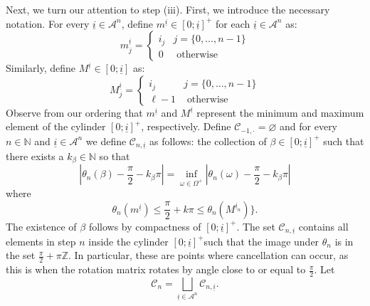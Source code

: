 \documentclass{amsart}
\newcommand{\NN}{\mathbb{N}}
\newcommand{\ZZ}{\mathbb{Z}}
\newcommand{\A}{\mathcal{A}}
\newcommand{\C}{\mathcal{C}}
\begin{document}
Next, we turn our attention to step (iii). First, we introduce the necessary notation. For every $\underline{i}\in \A^n$, define $m^{\underline{i}} \in [0;\underline{i}]^+$ for each $\underline{i}\in \A^n$ as:
\[m_j^{\underline{i}} = \begin{cases}
    i_j & j = \{0,\dots, n-1\}\\
    0 & \text{ otherwise }
\end{cases}\]
Similarly, define $M^{\underline{i}} \in [0;\underline{i}]$ as:
\[M_j^{\underline{i}} = \begin{cases}
    i_j & j = \{0,\dots, n-1\}\\
    \ell-1 & \text{ otherwise }
\end{cases}\]
Observe from our ordering that $m^{\underline{i}}$ and $M^{\underline{i}}$ represent the minimum and maximum element of the cylinder $[0;\underline{i}]^+$, respectively. Define $\C_{-1, \cdot} = \varnothing$ and for every $n\in \NN$ and $\underline{i}\in \A^n$ we define $\C_{n,\underline{i}}$ as follows: the collection of $\beta\in [0;\underline{i}]^+$ such that there exists a $k_\beta\in \NN$ so that 
\[|\theta_n(\beta) - \frac{\pi}{2} - k_\beta\pi| = \inf_{\omega\in \Omega^+}|\theta_n(\omega) - \frac{\pi}{2} - k_\beta\pi|\] 
where 
\[\theta_n(m^{\underline{i}})\leq \frac{\pi}{2} + k\pi \leq \theta_n(M^{\underline{i}_n})\}.\]
The existence of $\beta$ follows by compactness of $[0;\underline{i}]^+$. The set $\C_{n,\underline{i}}$ contains all elements in step $n$ inside the cylinder $[0;\underline{i}]^+$such that the image under $\theta_n$ is in the set $\frac{\pi}{2}+\pi\ZZ$. In particular, these are points where cancellation can occur, as this is when the rotation matrix rotates by angle close to or equal to $\frac{\pi}{2}$. Let
\begin{equation}\label{e.definecn}
    \C_n = \bigsqcup_{\underline{i}\in \A^n} \C_{n,\underline{i}}.
\end{equation}
\end{document}
